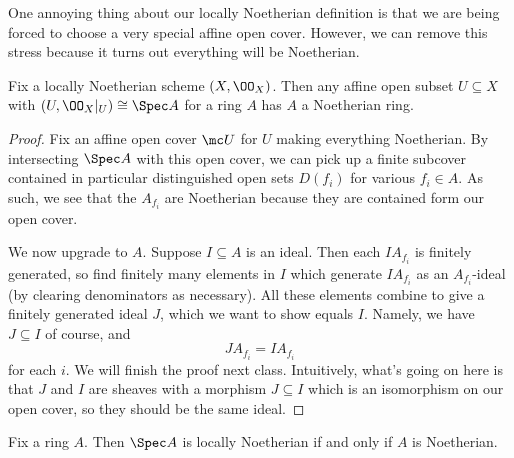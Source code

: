 \documentclass[../notes.tex]{subfiles}
\begin{document}
One annoying thing about our locally Noetherian definition is that we are being forced to choose a very special affine open cover. However, we can remove this stress because it turns out everything will be Noetherian.
\begin{proposition}
	Fix a locally Noetherian scheme $(X,\OO_X)$. Then any affine open subset $U\subseteq X$ with $(U,\OO_X|_U)\cong\Spec A$ for a ring $A$ has $A$ a Noetherian ring.
\end{proposition}
\begin{proof}
	Fix an affine open cover $\mc U$ for $U$ making everything Noetherian. By intersecting $\Spec A$ with this open cover, we can pick up a finite subcover contained in particular distinguished open sets $D(f_i)$ for various $f_i\in A$. As such, we see that the $A_{f_i}$ are Noetherian because they are contained form our open cover.

	We now upgrade to $A$. Suppose $I\subseteq A$ is an ideal. Then each $IA_{f_i}$ is finitely generated, so find finitely many elements in $I$ which generate $IA_{f_i}$ as an $A_{f_i}$-ideal (by clearing denominators as necessary). All these elements combine to give a finitely generated ideal $J$, which we want to show equals $I$. Namely, we have $J\subseteq I$ of course, and
	\[JA_{f_i}=IA_{f_i}\]
	for each $i$. We will finish the proof next class. Intuitively, what's going on here is that $J$ and $I$ are sheaves with a morphism $J\subseteq I$ which is an isomorphism on our open cover, so they should be the same ideal.
\end{proof}
\begin{cor}
	Fix a ring $A$. Then $\Spec A$ is locally Noetherian if and only if $A$ is Noetherian.
\end{cor}
\end{document}
